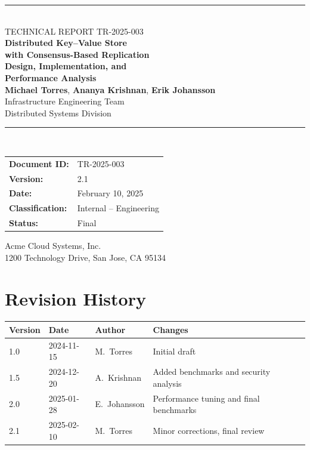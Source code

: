 \documentclass[12pt,a4paper]{report}
\begin{document}
\begin{titlepage}
\centering
\vspace*{1cm}

{\color{headerblue}\rule{\textwidth}{2pt}}\\[1cm]

{\small\color{codegray} TECHNICAL REPORT TR-2025-003}\\[1cm]
{\fontsize{28}{34}\selectfont\bfseries\color{headerblue}
  Distributed Key--Value Store\\with Consensus-Based Replication\\[0.3cm]
  Design, Implementation, and\\Performance Analysis}\\[1.5cm]

{\Large
  \textbf{Michael Torres}, \textbf{Ananya Krishnan}, \textbf{Erik Johansson}}\\[0.5cm]
{\large Infrastructure Engineering Team\\Distributed Systems Division}\\[1.5cm]

{\color{headerblue}\rule{0.6\textwidth}{0.5pt}}\\[1cm]

{\large
\begin{tabular}{ll}
\textbf{Document ID:} & TR-2025-003 \\
\textbf{Version:} & 2.1 \\
\textbf{Date:} & February 10, 2025 \\
\textbf{Classification:} & Internal -- Engineering \\
\textbf{Status:} & Final \\
\end{tabular}}

\vfill

{\large Acme Cloud Systems, Inc.\\
1200 Technology Drive, San Jose, CA 95134}

\end{titlepage}

\chapter*{Revision History}

\begin{table}[H]
\centering
\begin{tabular}{@{}llll@{}}
\toprule
\textbf{Version} & \textbf{Date} & \textbf{Author} & \textbf{Changes} \\
\midrule
1.0 & 2024-11-15 & M.\ Torres & Initial draft \\
1.5 & 2024-12-20 & A.\ Krishnan & Added benchmarks and security analysis \\
2.0 & 2025-01-28 & E.\ Johansson & Performance tuning and final benchmarks \\
2.1 & 2025-02-10 & M.\ Torres & Minor corrections, final review \\
\bottomrule
\end{tabular}
\end{table}
\end{document}

